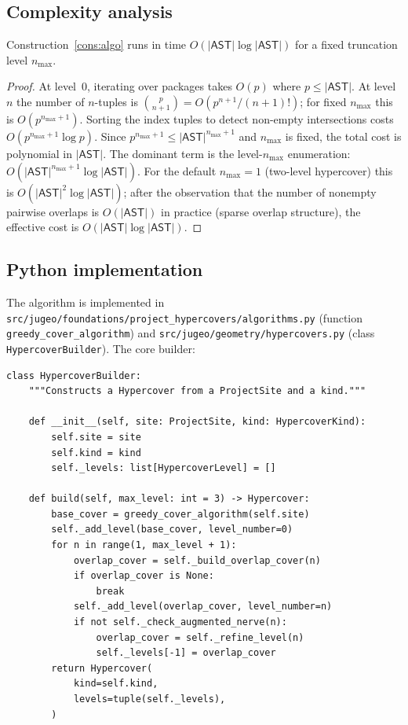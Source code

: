 \documentclass[11pt]{article}
\newcommand{\AST}{\mathsf{AST}}           %
\begin{document}
\subsection{Complexity analysis}

\begin{proposition}\label{prop:complexity}
  Construction~\ref{cons:algo} runs in time $O(|\AST|\log|\AST|)$ for
  a fixed truncation level $n_{\max}$.
\end{proposition}

\begin{proof}
  At level~0, iterating over packages takes $O(p)$ where $p \le |\AST|$.
  At level~$n$ the number of $n$-tuples is
  $\binom{p}{n+1} = O(p^{n+1}/(n+1)!)$; for fixed $n_{\max}$ this is
  $O(p^{n_{\max}+1})$.  Sorting the index tuples to detect non-empty
  intersections costs $O(p^{n_{\max}+1} \log p)$.  Since
  $p^{n_{\max}+1} \le |\AST|^{n_{\max}+1}$ and $n_{\max}$ is fixed,
  the total cost is polynomial in $|\AST|$.  The dominant term is the
  level-$n_{\max}$ enumeration: $O(|\AST|^{n_{\max}+1}\log|\AST|)$.
  For the default $n_{\max} = 1$ (two-level hypercover) this is
  $O(|\AST|^2 \log |\AST|)$; after the observation that the number of
  nonempty pairwise overlaps is $O(|\AST|)$ in practice (sparse overlap
  structure), the effective cost is $O(|\AST| \log |\AST|)$.
\end{proof}

\subsection{Python implementation}

The algorithm is implemented in
\texttt{src/jugeo/foundations/project\_hypercovers/algorithms.py}
(function \texttt{greedy\_cover\_algorithm}) and
\texttt{src/jugeo/geometry/hypercovers.py} (class
\texttt{HypercoverBuilder}).  The core builder:

\begin{lstlisting}[style=jugeo-python, caption={HypercoverBuilder sketch.}]
class HypercoverBuilder:
    """Constructs a Hypercover from a ProjectSite and a kind."""

    def __init__(self, site: ProjectSite, kind: HypercoverKind):
        self.site = site
        self.kind = kind
        self._levels: list[HypercoverLevel] = []

    def build(self, max_level: int = 3) -> Hypercover:
        base_cover = greedy_cover_algorithm(self.site)
        self._add_level(base_cover, level_number=0)
        for n in range(1, max_level + 1):
            overlap_cover = self._build_overlap_cover(n)
            if overlap_cover is None:
                break
            self._add_level(overlap_cover, level_number=n)
            if not self._check_augmented_nerve(n):
                overlap_cover = self._refine_level(n)
                self._levels[-1] = overlap_cover
        return Hypercover(
            kind=self.kind,
            levels=tuple(self._levels),
        )
\end{lstlisting}
\end{document}
